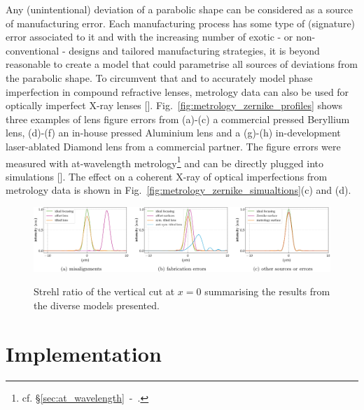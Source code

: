 \begin{refsection}
Any (unintentional) deviation of a parabolic shape can be considered as a source of manufacturing error. Each manufacturing process has some type of (signature) error associated to it and with the increasing number of exotic - or non-conventional - designs and tailored manufacturing strategies, it is beyond reasonable to create a model that could parametrise all sources of deviations from the parabolic shape. To circumvent that and to accurately model phase imperfection in compound refractive lenses, metrology data can also be used for optically imperfect X-ray lenses [\cite{Celestre2020, Chubar2020}]. Fig.~\ref{fig:metrology_zernike_profiles} shows three examples of lens figure errors from (a)-(c) a commercial pressed Beryllium lens, (d)-(f) an in-house pressed Aluminium lens and a (g)-(h) in-development laser-ablated Diamond lens from a commercial partner. The figure errors were measured with at-wavelength metrology\footnote{cf. \S\ref{sec:at_wavelength}~-~\textit{}.} and can be directly plugged into simulations [\cite{Celestre2020}]. The effect on a coherent X-ray of optical imperfections from metrology data is shown in Fig.~\ref{fig:metrology_zernike_simualtions}(c) and (d).

\begin{figure}[t]
        \centering
        {\includegraphics[width=1.\linewidth]{figures/ch04/Strehl}}
        \caption[Strehl ratio summarising the results from the diverse models presented]{Strehl ratio of the vertical cut at $x=0$ summarising the results from the diverse models presented.} \label{fig:Strehl}
\end{figure}

\section{Implementation}


\end{refsection}
